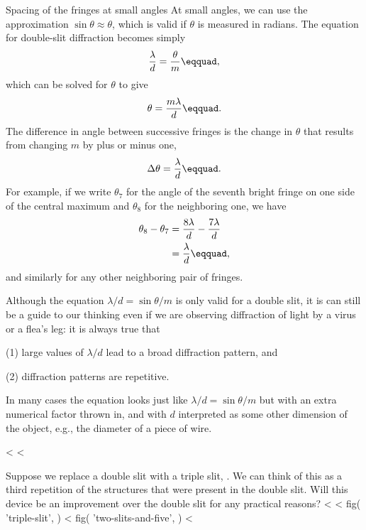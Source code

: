 \enlargethispage{\baselineskip}

\begin{eg}{Spacing of the fringes at small angles}\label{eg:diffraction-delta-theta}
At small angles, we can use the approximation $\sin\theta\approx\theta$, which is
valid if $\theta $ is measured in radians. The equation for
double-slit diffraction becomes simply
\begin{equation*}
 \frac{\lambda}{d} = \frac{\theta}{m}\eqquad,
\end{equation*}
which can be solved for $\theta $ to give
\begin{equation*}
  \theta = \frac{m\lambda}{d}\eqquad.
\end{equation*}
The difference in angle between successive fringes is the
change in $\theta $ that results from changing $m$
by plus or minus one,
\begin{equation*}
                \Delta\theta  = \frac{\lambda}{d}\eqquad.
\end{equation*}
For example, if we write $\theta_7$ for the angle of the
seventh bright fringe on one side of the central maximum and
$\theta_8$ for the neighboring one, we have
\begin{align*}
                \theta_8-\theta_7 &= \frac{8\lambda}{d}-\frac{7\lambda}{d}\\
                         &= \frac{\lambda}{d}\eqquad,
\end{align*}
and similarly for any other neighboring pair of fringes.
\end{eg}

Although the equation $\lambda /d=\sin \theta /m$ is only
valid for a double slit, it is can still be a guide to our
thinking even if we are observing diffraction of light by a
virus or a flea's leg: it is always true that

(1) large values of $\lambda /d$ lead to a broad diffraction pattern, and

(2) diffraction patterns are repetitive.

In many cases the equation looks just like 
$\lambda /d =\sin \theta /m$ but with an extra numerical factor thrown
in, and with $d$ interpreted as some other dimension of the
object, e.g., the diameter of a piece of wire.

\enlargethispage{-4\baselineskip}

<%
<%

Suppose we replace a double slit with a triple slit, . We
can think of this as a third repetition of the structures that were
present in the double slit. Will this device be an
improvement over the double slit for any practical reasons?
<%
<%
  fig(
    'triple-slit',
  )
\spacebetweenfigs
<%
  fig(
    'two-slits-and-five',
  )
<%

